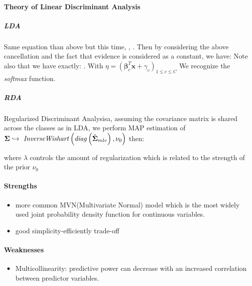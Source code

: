 \paragraph{Theory of Linear Discriminant Analysis}
\subparagraph{LDA}
Same equation than above but this time, , .
Then by considering the above cancellation and the fact that 
evidence is considered as a constant, we have:
Note also that we have exactly: . With $\eta=\left(
\bm{\beta}^{T}_{c}\bm{x} +\gamma_{c}\right)_{1\leq c\leq C}$
We recognize the \emph{softmax} function.
\subparagraph{RDA}
Regularized Discriminant Analysisa, assuming the covariance matrix is shared across the classes as in
LDA, we perform MAP estimation of $\bm{\Sigma}\hookrightarrow\text{ \emph{InverseWishart}}\left(
\text{\emph{diag}}\left(\hat{\bm{\Sigma}}_{mle}\right), \nu_{0}\right)$ then:
\begin{center}
\end{center}
where $\lambda$ controls the amount of regularization which is related to the strength of the prior
$\nu_{0}$


\paragraph{Strengths}
\begin{itemize}
    \item more common MVN(Multivariate Normal) model which is the most widely used joint probability
        density function for continuous variables.
    \item good simplicity-efficiently trade-off 
\end{itemize}

\paragraph{Weaknesses}
\begin{itemize}
    \item Multicollinearity: predictive power can decrease with an 
        increased correlation between predictor variables.
\end{itemize}

